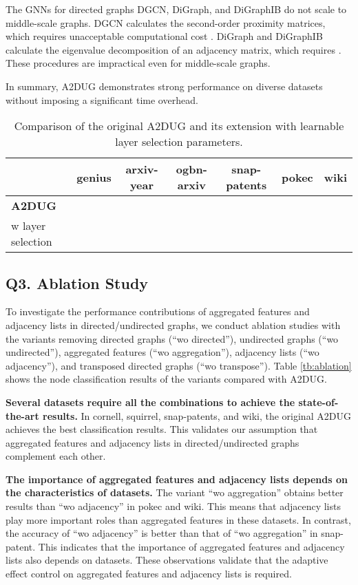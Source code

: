 The GNNs for directed graphs DGCN, DiGraph, and DiGraphIB do not scale to middle-scale graphs.
DGCN \cite{tong2020directed} calculates the second-order proximity matrices, which requires unacceptable computational cost . DiGraph and DiGraphIB \cite{tong2020digraph} calculate the eigenvalue decomposition of an adjacency matrix, which requires . These procedures are impractical even for middle-scale graphs.

In summary, A2DUG demonstrates strong performance on diverse datasets without imposing a significant time overhead. 

\begin{table*}[t]
    \caption{Comparison of the original A2DUG and its extension with learnable layer selection parameters. 
    }
    \centering
\begin{tabular}{l|ccc|ccc}
\toprule
 & genius & arxiv-year & ogbn-arxiv & snap-patents & pokec & wiki \\
\midrule
\textbf{A2DUG} &  &  &  &  &  &  \\
w layer selection &  &  &  &  &  &  \\
\bottomrule
\end{tabular}
\label{tb:layer_selection}
\end{table*}

\subsection{Q3. Ablation Study}
\label{ssec:ablation}
To investigate the performance contributions of aggregated features and adjacency lists in directed/undirected graphs, we conduct ablation studies with the variants removing directed graphs (``wo directed''), undirected graphs (``wo undirected''), aggregated features (``wo aggregation''), adjacency lists (``wo adjacency''), and transposed directed graphs (``wo transpose''). 
Table \ref{tb:ablation} shows the node classification results of the variants compared with \textsc{A2DUG}. 

\smallskip \noindent \textbf{Several datasets require all the combinations to achieve the state-of-the-art results. }
In cornell, squirrel, snap-patents, and wiki, the original \textsc{A2DUG} achieves the best classification results. 
This validates our assumption that aggregated features and adjacency lists in directed/undirected graphs complement each other. 


\smallskip \noindent \textbf{The importance of aggregated features and adjacency lists depends on the characteristics of datasets. }
The variant ``wo aggregation'' obtains better results than ``wo adjacency'' in pokec and wiki. 
This means that adjacency lists play more important roles than aggregated features in these datasets. 
In contrast, the accuracy of ``wo adjacency'' is better than that of ``wo aggregation'' in snap-patent. 
This indicates that the importance of aggregated features and adjacency lists also depends on datasets. 
These observations validate that the adaptive effect control on aggregated features and adjacency lists is required. 

